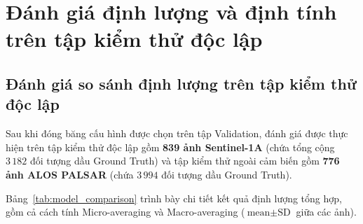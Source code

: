 \section{Đánh giá định lượng và định tính trên tập kiểm thử độc lập}
\label{sec:danh_gia_test_phan_tang}

\subsection{Đánh giá so sánh định lượng trên tập kiểm thử độc lập}

Sau khi đóng băng cấu hình được chọn trên tập Validation, đánh giá được thực hiện trên tập kiểm thử độc lập gồm \textbf{839 ảnh Sentinel-1A} (chứa tổng cộng $3\,182$ đối tượng dầu Ground Truth) và tập kiểm thử ngoài cảm biến gồm \textbf{776 ảnh ALOS PALSAR} (chứa $3\,994$ đối tượng dầu Ground Truth).

Bảng~\ref{tab:model_comparison} trình bày chi tiết kết quả định lượng tổng hợp, gồm cả cách tính Micro-averaging và Macro-averaging ($\text{mean} \pm \text{SD}$ giữa các ảnh).

